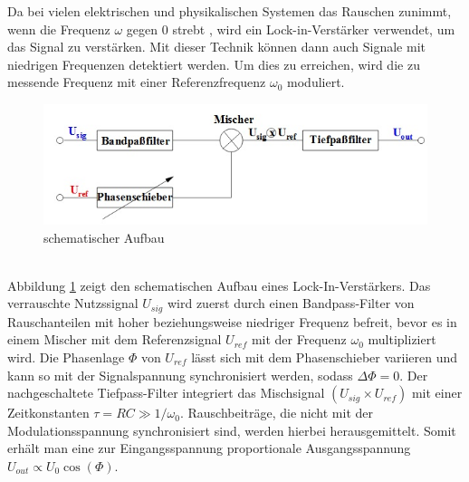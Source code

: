 Da bei vielen elektrischen und physikalischen Systemen das Rauschen zunimmt, wenn
die Frequenz $\omega$ gegen 0 strebt \cite{enet}, wird ein Lock-in-Verstärker
verwendet, um das Signal zu verstärken. Mit dieser Technik können dann auch
Signale mit niedrigen Frequenzen detektiert werden. Um dies zu erreichen, wird die
zu messende Frequenz mit einer Referenzfrequenz $\omega_0$ moduliert. \\
\begin{figure}[h]
  \includegraphics{Bilder/Schema.jpeg}
  \caption{schematischer Aufbau}
  \label{fig:schema}
\end{figure} \\
Abbildung \ref{fig:schema} zeigt den schematischen Aufbau eines Lock-In-Verstärkers.
Das verrauschte Nutzssignal $U_{sig}$ wird zuerst durch einen Bandpass-Filter
von Rauschanteilen mit hoher beziehungsweise niedriger Frequenz befreit, bevor
es in einem Mischer mit dem Referenzsignal $U_{ref}$ mit der Frequenz $\omega_0$
multipliziert wird. Die Phasenlage $\Phi$ von $U_{ref}$ lässt sich mit dem
Phasenschieber variieren und kann so mit der Signalspannung synchronisiert werden,
sodass $\Delta\Phi =0$.
Der nachgeschaltete Tiefpass-Filter integriert das Mischsignal $(U_{sig}\times U_{ref})$
mit einer Zeitkonstanten $\tau = RC \gg 1/\omega_0$.
Rauschbeiträge, die nicht mit der Modulationsspannung synchronisiert sind, werden
hierbei herausgemittelt. Somit erhält man eine zur Eingangsspannung proportionale
Ausgangsspannung $U_{out} \propto U_0 \cos(\Phi)$.

